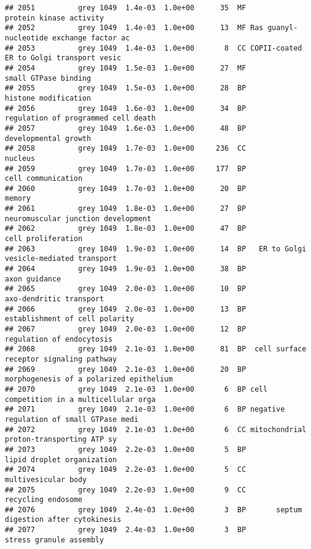 \documentclass[]{article}
\begin{document}
\begin{verbatim}
## 2051          grey 1049  1.4e-03  1.0e+00      35  MF                  protein kinase activity
## 2052          grey 1049  1.4e-03  1.0e+00      13  MF Ras guanyl-nucleotide exchange factor ac
## 2053          grey 1049  1.4e-03  1.0e+00       8  CC COPII-coated ER to Golgi transport vesic
## 2054          grey 1049  1.5e-03  1.0e+00      27  MF                     small GTPase binding
## 2055          grey 1049  1.5e-03  1.0e+00      28  BP                     histone modification
## 2056          grey 1049  1.6e-03  1.0e+00      34  BP      regulation of programmed cell death
## 2057          grey 1049  1.6e-03  1.0e+00      48  BP                     developmental growth
## 2058          grey 1049  1.7e-03  1.0e+00     236  CC                                  nucleus
## 2059          grey 1049  1.7e-03  1.0e+00     177  BP                       cell communication
## 2060          grey 1049  1.7e-03  1.0e+00      20  BP                                   memory
## 2061          grey 1049  1.8e-03  1.0e+00      27  BP       neuromuscular junction development
## 2062          grey 1049  1.8e-03  1.0e+00      47  BP                       cell proliferation
## 2063          grey 1049  1.9e-03  1.0e+00      14  BP   ER to Golgi vesicle-mediated transport
## 2064          grey 1049  1.9e-03  1.0e+00      38  BP                            axon guidance
## 2065          grey 1049  2.0e-03  1.0e+00      10  BP                  axo-dendritic transport
## 2066          grey 1049  2.0e-03  1.0e+00      13  BP           establishment of cell polarity
## 2067          grey 1049  2.0e-03  1.0e+00      12  BP                regulation of endocytosis
## 2068          grey 1049  2.1e-03  1.0e+00      81  BP  cell surface receptor signaling pathway
## 2069          grey 1049  2.1e-03  1.0e+00      20  BP  morphogenesis of a polarized epithelium
## 2070          grey 1049  2.1e-03  1.0e+00       6  BP cell competition in a multicellular orga
## 2071          grey 1049  2.1e-03  1.0e+00       6  BP negative regulation of small GTPase medi
## 2072          grey 1049  2.1e-03  1.0e+00       6  CC mitochondrial proton-transporting ATP sy
## 2073          grey 1049  2.2e-03  1.0e+00       5  BP               lipid droplet organization
## 2074          grey 1049  2.2e-03  1.0e+00       5  CC                      multivesicular body
## 2075          grey 1049  2.2e-03  1.0e+00       9  CC                       recycling endosome
## 2076          grey 1049  2.4e-03  1.0e+00       3  BP       septum digestion after cytokinesis
## 2077          grey 1049  2.4e-03  1.0e+00       3  BP                  stress granule assembly

\end{verbatim}
\end{document}

